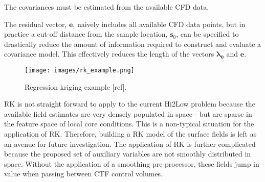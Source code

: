 The covariances must be estimated from the available CFD data.  

The residual vector, $\mathbf e$, naively includes all available CFD data points, but in practice a cut-off distance from the sample location, $\mathbf s_0$, can be specified to drastically reduce the amount of information required to construct and evaluate a covariance model.  This effectively reduces the length of the vectors $\mathbf{\lambda_0}$ and $\mathbf e$.

\begin{figure}[hbtp]
\centering
\texttt{[image: images/rk\_example.png]}
\caption{Regression kriging example [ref].}
\label{fit:rk}
\end{figure}

RK is not straight forward to apply to the current Hi2Low problem because the available field estimates are very densely populated in space - but are sparse in the feature space of local core conditions. This is a non-typical situation for the application of RK. Therefore, building a RK model of the surface fields is left as an avenue for future investigation.
The application of RK is further complicated because the proposed set of auxiliary variables are not smoothly distributed in space.  Without the application of a smoothing pre-processor, these
fields jump in value when passing between CTF control volumes.

